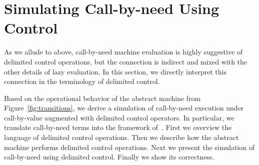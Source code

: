 \documentclass{LMCS}
\theoremstyle{plain}
\theoremstyle{remark}
\begin{document}
\section{Simulating Call-by-need Using Control}


As we allude to above, call-by-need machine evaluation is highly suggestive of
delimited control operations, but the connection is indirect and mixed with the
other details of lazy evaluation.  In this section, we directly interpret this
connection in the terminology of delimited control.








Based on the operational behavior of the abstract machine from
Figure~\ref{fig:transitions}, we derive a simulation of call-by-need execution
under call-by-value augmented with delimited control operators.  In particular,
we translate call-by-need terms into the framework
of~\citet{dybvig07monadic}. First we overview the language of delimited control
operations.  Then we describe how the abstract machine performs delimited
control operations.  Next we present the simulation of call-by-need using
delimited control.  Finally we show its correctness.
\end{document}
